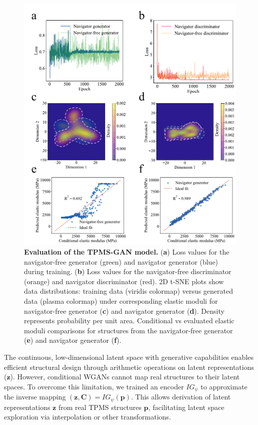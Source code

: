 \documentclass[preprint,review,12pt,authoryear]{elsarticle}
\begin{document}
\begin{figure}
    \centering
    \includegraphics[width=0.75\linewidth]{figures/4.pdf}
    \caption{\textbf{Evaluation of the TPMS-GAN model.} (\textbf{a}) Loss values for the navigator-free generator (green) and navigator generator (blue) during training. (\textbf{b}) Loss values for the navigator-free discriminator (orange) and navigator discriminator (red). 2D t-SNE plots show data distributions: training data (viridis colormap) versus generated data (plasma colormap) under corresponding elastic moduli for navigator-free generator (\textbf{c}) and navigator generator (\textbf{d}). Density represents probability per unit area. Conditional vs evaluated elastic moduli comparisons for structures from the navigator-free generator (\textbf{e}) and navigator generator (\textbf{f}).}
    \label{fig:4}
\end{figure}

The continuous, low-dimensional latent space with generative capabilities enables efficient structural design through arithmetic operations on latent representations ($\boldsymbol{z}$). However, conditional WGANs cannot map real structures to their latent spaces. To overcome this limitation, we trained an encoder $IG_\psi$ to approximate the inverse mapping $(\boldsymbol{z},\boldsymbol{C})=IG_\psi(\boldsymbol{p})$. This allows derivation of latent representations $\boldsymbol{z}$ from real TPMS structures $\boldsymbol{p}$, facilitating latent space exploration via interpolation or other transformations.
\end{document}
